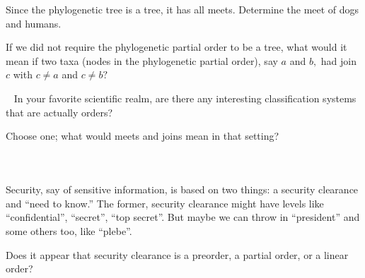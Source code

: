 \documentclass[../main/CT4S-EN-RU]{subfiles}
\begin{document}
\begin{blockRUS}
\end{blockRUS}

\begin{exerciseENG}
Since the phylogenetic tree is a tree, it has all meets.
\sexc Determine the meet of dogs and humans. 
\item If we did not require the phylogenetic partial order to be a tree, what would it mean if two taxa (nodes in the phylogenetic partial order), say $a$ and $b,$ had join $c$ with $c\neq a$ and $c\neq b?$
\endsexc
\end{exerciseENG}

\begin{exerciseRUS}
\end{exerciseRUS}

\begin{exerciseENG}~
\sexc In your favorite scientific realm, are there any interesting classification systems that are actually orders? 
\item Choose one; what would meets and joins mean in that setting?
\endsexc
\end{exerciseENG}

\begin{exerciseRUS}~
\end{exerciseRUS}


\subsubsection{}

\begin{blockENG}
Security, say of sensitive information, is based on two things: a security clearance and “need to know.” The former, security clearance might have levels like “confidential”, “secret”, “top secret”. But maybe we can throw in “president” and some others too, like “plebe”. 
\end{blockENG}

\begin{blockRUS}
\end{blockRUS}

\begin{exerciseENG}
Does it appear that security clearance is a preorder, a partial order, or a linear order?
\end{exerciseENG}

\begin{exerciseRUS}
\end{exerciseRUS}
\end{document}
